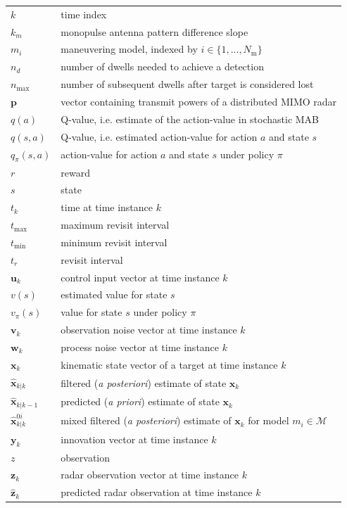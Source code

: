 \documentclass[english, 12pt, a4paper, elec, utf8, a-1b, online]{aaltothesis}
\numberwithin{equation}{section}
\renewcommand{\vec}[1]{\mathbf{#1}}
\newcommand{\xprior}{\hat{\vec{x}}_{k|k-1}}
\newcommand{\xpost}{\hat{\vec{x}}_{k|k}}
\newcommand{\prefitinnov}{\vec{y}_k}
\newcommand{\x}{\vec{x}_k}
\newcommand{\z}{\vec{z}_k}
\newcommand{\cinput}{\vec{u}_k}
\newcommand{\pnoise}{\vec{w}_k}
\newcommand{\onoise}{\vec{v}_k}
\newcommand{\tmax}{t_\text{max}}
\newcommand{\tmin}{t_\text{min}}
\newcommand{\xmxinitcurr}{\hat{\vec{x}}^{0i}_{k|k}}
\def\prior{\textit{a priori}}
\def\post{\textit{a posteriori}}
\newcommand{\zhat}{\hat{\vec{z}}_k}
\newcommand{\mimm}{\mathcal{M}}
\newcommand{\nmodels}{{N_\text{m}}}
\newcommand{\vpower}{\boldsymbol{p}}
\newcommand{\ri}{t_r}
\begin{document}
\begin{longtable}[l]{ll}
$k$ & time index \\
$k_m$ & monopulse antenna pattern difference slope \\
$m_i$ & maneuvering model, indexed by $i \in \{1, ..., \nmodels\}$ \\
$n_d$ & number of dwells needed to achieve a detection \\
$n_\text{max}$ & number of subsequent dwells after target is considered lost \\
$\vpower$ & vector containing transmit powers of a distributed MIMO radar \\
$q(a)$ & Q-value, i.e. estimate of the action-value in stochastic MAB \\
$q(s, a)$ &  Q-value, i.e. estimated action-value for action $a$ and state $s$ \\
$q_\pi(s, a)$ & action-value for action $a$ and state $s$ under policy $\pi$ \\
$r$ & reward \\
$s$ & state \\
$t_k$ & time at time instance $k$ \\
$\tmax$ & maximum revisit interval \\
$\tmin$ & minimum revisit interval \\
$\ri$ & revisit interval \\
$\cinput$ & control input vector at time instance $k$\\
$v(s)$ & estimated value for state $s$ \\
$v_\pi(s)$ & value for state $s$ under policy $\pi$ \\
$\onoise$ & observation noise vector at time instance $k$\\
$\pnoise$ & process noise vector at time instance $k$\\
$\x$ & kinematic state vector of a target at time instance $k$ \\
$\xpost$ & filtered (\post{}) estimate of state $\x$ \\
$\xprior$ & predicted (\prior{}) estimate of state $\x$\\
$\xmxinitcurr$ & mixed filtered (\post{}) estimate of $\x$ for model $m_i \in \mimm$\\
$\prefitinnov$ & innovation vector at time instance $k$ \\
$z$ & observation \\
$\z$ & radar observation vector at time instance $k$ \\
$\zhat$ & predicted radar observation at time instance $k$ \\
\end{longtable}
\end{document}
